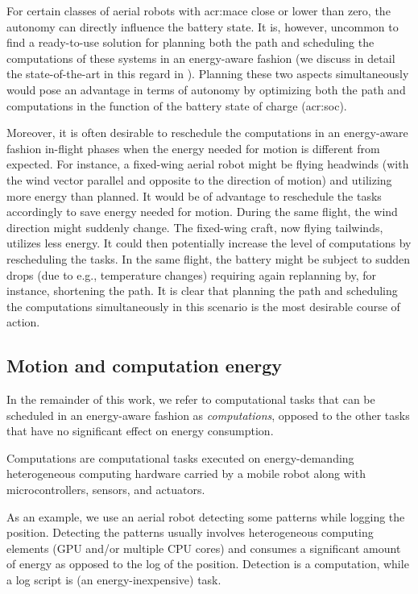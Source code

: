For certain classes of aerial robots with \Gls{acr:mace} close or lower than zero, the autonomy can directly influence the battery state. It is, however, uncommon to find a ready-to-use solution for planning both the path and scheduling the computations of these systems in an energy-aware fashion (we discuss in detail the state-of-the-art in this regard in ). Planning these two aspects simultaneously would pose an advantage in terms of autonomy by optimizing both the path and computations in the function of the battery state of charge (\Gls{acr:soc}). 

Moreover, it is often desirable to reschedule the computations in an energy-aware fashion in-flight phases when the energy needed for motion is different from expected. For instance, a fixed-wing aerial robot might be flying headwinds (with the wind vector parallel and opposite to the direction of motion) and utilizing more energy than planned. It would be of advantage to reschedule the tasks accordingly to save energy needed for motion. During the same flight, the wind direction might suddenly change. The fixed-wing craft, now flying tailwinds, utilizes less energy. It could then potentially increase the level of computations by rescheduling the tasks. In the same flight, the battery might be subject to sudden drops (due to e.g., temperature changes) requiring again replanning by, for instance, shortening the path. It is clear that planning the path and scheduling the computations simultaneously in this scenario is the most desirable course of action.

\subsection{Motion and computation energy}

In the remainder of this work, we refer to computational tasks that can be scheduled in an energy-aware fashion as \emph{computations}, opposed to the other tasks that have no significant effect on energy consumption.

\begin{highlight}
  \begin{defn}[Computations]
    Computations are computational tasks executed on energy-demanding heterogeneous computing hardware carried by a mobile robot along with microcontrollers, sensors, and actuators.
  \end{defn}
\end{highlight}

As an example, we use an aerial robot detecting some patterns while logging the position. Detecting the patterns usually involves heterogeneous computing elements (GPU and/or multiple CPU cores) and consumes a significant amount of energy as opposed to the log of the position. Detection is a computation, while a log script is (an energy-inexpensive) task.

